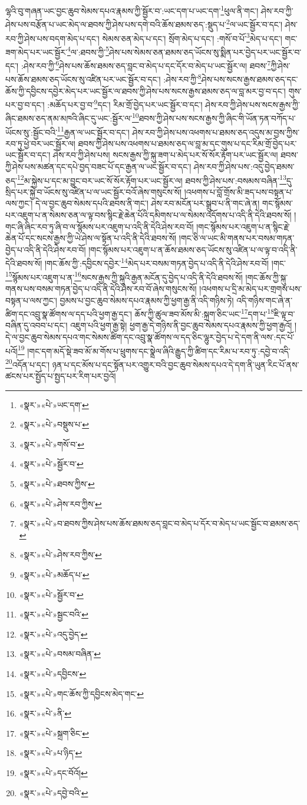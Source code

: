ལྷའི་བུ་གཞན་ཡང་བྱང་ཆུབ་སེམས་དཔའ་རྣམས་ཀྱི་སྦྱོར་བ་:ཡང་དག་པ་ཡང་དག་\footnote{«སྣར་»«པེ་»ཡང་དག་}ཕུལ་ནི་གང་། ཤེས་རབ་ཀྱི་ཤེས་པས་བརྩོན་པ་ཡང་མེད་ལ་ཐབས་ཀྱི་ཤེས་པས་དགེ་བའི་ཆོས་ཐམས་ཅད་:སྡུད་པ་\footnote{«སྣར་»«པེ་»བསྡུས་པ་}ལ་ཡང་སྦྱོར་བ་དང་། ཤེས་རབ་ཀྱི་ཤེས་པས་བདག་མེད་པ་དང་། སེམས་ཅན་མེད་པ་དང་། སྲོག་མེད་པ་དང་། :གསོ་བ་པོ་\footnote{«སྣར་»«པེ་»གསོ་བ་}མེད་པ་དང་། གང་ཟག་མེད་པར་ཡང་སྦྱོར་\footnote{«སྣར་»«པེ་»སྦྱོར་བ་}ལ་:ཐབས་ཀྱི་\footnote{«སྣར་»«པེ་»ཐབས་ཀྱིས་}ཤེས་པས་སེམས་ཅན་ཐམས་ཅད་ཡོངས་སུ་སྨིན་པར་བྱེད་པར་ཡང་སྦྱོར་བ་དང་། :ཤེས་རབ་ཀྱི་\footnote{«སྣར་»«པེ་»ཤེས་རབ་ཀྱིས་}ཤེས་པས་ཆོས་ཐམས་ཅད་བླང་བ་མེད་པ་དང་དོར་བ་མེད་པ་ཡང་སྦྱོར་ལ། ཐབས་\footnote{«སྣར་»«པེ་»བ་ཐབས་ཀྱིས་ཤེས་པས་ཆོས་ཐམས་ཅད་བླང་བ་མེད་པ་དོར་བ་མེད་པ་ཡང་སྦྱོང་བ་ཐམས་ཅད་}ཀྱི་ཤེས་པས་ཆོས་ཐམས་ཅད་ཡོངས་སུ་འཛིན་པར་ཡང་སྦྱོར་བ་དང་། :ཤེས་རབ་ཀྱི་\footnote{«སྣར་»«པེ་»ཤེས་རབ་ཀྱིས་}ཤེས་པས་སངས་རྒྱས་ཐམས་ཅད་དང་ཆོས་ཀྱི་དབྱིངས་དབྱེར་མེད་པར་ཡང་སྦྱོར་ལ་ཐབས་ཀྱི་ཤེས་པས་སངས་རྒྱས་ཐམས་ཅད་ལ་བླ་མར་བྱ་བ་དང་། གུས་པར་བྱ་བ་དང་། :མཆོད་པར་བྱ་བ་\footnote{«སྣར་»«པེ་»མཆོད་པ་}དང་། རིམ་གྲོ་བྱེད་པར་ཡང་སྦྱོར་བ་དང་། ཤེས་རབ་ཀྱི་ཤེས་པས་སངས་རྒྱས་ཀྱི་ཞིང་ཐམས་ཅད་ནམ་མཁའི་ཞིང་དུ་ཡང་:སྦྱོར་ལ་\footnote{«སྣར་»«པེ་»སྦྱོར་བ་}ཐབས་ཀྱི་ཤེས་པས་སངས་རྒྱས་ཀྱི་ཞིང་གི་ཡོན་ཏན་བཀོད་པ་ཡོངས་སུ་:སྦྱོང་བའི་\footnote{«སྣར་»«པེ་»སྦྱང་བའི་}རྒྱན་ལ་ཡང་སྦྱོར་བ་དང་། ཤེས་རབ་ཀྱི་ཤེས་པས་འཕགས་པ་ཐམས་ཅད་འདུས་མ་བྱས་ཀྱིས་རབ་ཏུ་ཕྱེ་བར་ཡང་སྦྱོར་ལ། ཐབས་ཀྱི་ཤེས་པས་འཕགས་པ་ཐམས་ཅད་ལ་བླ་མ་དང་གུས་པ་དང་རིམ་གྲོ་བྱེད་པར་ཡང་སྦྱོར་བ་དང་། ཤེས་རབ་ཀྱི་ཤེས་པས། སངས་རྒྱས་ཀྱི་སྐུ་ཟག་པ་མེད་པར་སོ་སོར་རྟོག་པར་ཡང་སྦྱོར་ལ། ཐབས་ཀྱི་ཤེས་པས་མཚན་དང་དཔེ་བྱད་བཟང་པོ་དང་རྒྱན་ལ་ཡང་སྦྱོར་བ་དང་། ཤེས་རབ་ཀྱི་ཤེས་པས་:འདུ་བྱེད་ཐམས་ཅད་\footnote{«སྣར་»«པེ་»འདུ་བྱེད་}མ་སྐྱེས་པ་དང་མ་བྱུང་བར་ཡང་སོ་སོར་རྟོག་པར་ཡང་སྦྱོར་ལ། ཐབས་ཀྱི་ཤེས་པས་:བསམས་བཞིན་\footnote{«སྣར་»«པེ་»བསམ་བཞིན་}དུ་སྲིད་པར་སྐྱེ་བ་ཡོངས་སུ་འཛིན་པ་ལ་ཡང་སྦྱོར་བའོ་ཞེས་གསུངས་སོ། །འཕགས་པ་བློ་གྲོས་མི་ཟད་པས་བསྟན་པ་ལས་ཀྱང་། དེ་ལ་བྱང་ཆུབ་སེམས་དཔའི་ཐབས་ནི་གང་། ཤེས་རབ་མངོན་པར་སྒྲུབ་པ་ནི་གང་ཞེ་ན། གང་སྙོམས་པར་འཇུག་པ་ན་སེམས་ཅན་ལ་ལྟ་བས་སྙིང་རྗེ་ཆེན་པོའི་དམིགས་པ་ལ་སེམས་འདོགས་པ་འདི་ནི་དེའི་ཐབས་སོ། །གང་ཞི་ཞིང་རབ་ཏུ་ཞི་བ་ལ་སྙོམས་པར་འཇུག་པ་འདི་ནི་དེའི་ཤེས་རབ་བོ། །གང་སྙོམས་པར་འཇུག་པ་ན་སྙིང་རྗེ་ཆེན་པོ་དང་སངས་རྒྱས་ཀྱི་ཡེ་ཤེས་ལ་སྟོན་པ་འདི་ནི་དེའི་ཐབས་སོ། །གང་ཅི་ལ་ཡང་མི་གནས་པར་བསམ་གཏན་བྱེད་པ་འདི་ནི་དེའི་ཤེས་རབ་བོ། །གང་སྙོམས་པར་འཇུག་པ་ན་ཆོས་ཐམས་ཅད་ཡོངས་སུ་འཛིན་པ་ལ་ལྟ་བ་འདི་ནི་དེའི་ཐབས་སོ། །གང་ཆོས་ཀྱི་:དབྱིངས་དབྱེར་\footnote{«སྣར་»«པེ་»དབྱིངས་}མེད་པར་བསམ་གཏན་བྱེད་པ་འདི་ནི་དེའི་ཤེས་རབ་བོ། །གང་\footnote{«སྣར་»«པེ་»གང་ཆོས་ཀྱི་དབྱིངས་མེད་གང་}སྙོམས་པར་འཇུག་པ་ན་\footnote{«སྣར་»«པེ་»ནི་}སངས་རྒྱས་ཀྱི་སྐུའི་རྒྱན་མངོན་དུ་བྱེད་པ་འདི་ནི་དེའི་ཐབས་སོ། །གང་ཆོས་ཀྱི་སྐུ་གནས་པས་བསམ་གཏན་བྱེད་པ་འདི་ནི་དེའི་ཤེས་རབ་བོ་ཞེས་གསུངས་སོ། །འཕགས་པ་དྲི་མ་མེད་པར་གྲགས་པས་བསྟན་པ་ལས་ཀྱང་། བྱམས་པ་བྱང་ཆུབ་སེམས་དཔའ་རྣམས་ཀྱི་ཕྱག་རྒྱ་ནི་འདི་གཉིས་ཏེ། འདི་གཉིས་གང་ཞེ་ན་ཚིག་དང་འབྲུ་སྣ་ཚོགས་ལ་དད་པའི་ཕྱག་རྒྱ་དང་། ཆོས་ཀྱི་ཚུལ་ཟབ་མོས་མི་:སྐྲག་ཅིང་ཡང་\footnote{«སྣར་»«པེ་»སྐྲག་ཅིང་}དག་པ་\footnote{«སྣར་»«པེ་»པ་ཉིད་}ཇི་ལྟ་བ་བཞིན་དུ་འབབ་པ་དང་། འཇུག་པའི་ཕྱག་རྒྱ་སྟེ། ཕྱག་རྒྱ་དེ་གཉིས་ནི་བྱང་ཆུབ་སེམས་དཔའ་རྣམས་ཀྱི་ཕྱག་རྒྱའོ། །དེ་ལ་བྱང་ཆུབ་སེམས་དཔའ་གང་སེམས་ཚིག་དང་འབྲུ་སྣ་ཚོགས་ལ་དད་ཅིང་ལྷུར་བྱེད་པ་དེ་དག་ནི་ལས་:དང་པོ་པའོ།\footnote{«སྣར་»«པེ་»དང་བོའོ།} །གང་དག་མདོ་སྡེ་ཟབ་མོ་མ་གོས་པ་ཕྲུགས་དང་སྣྲེལ་ཞིའི་རྒྱུད་ཀྱི་ཚིག་དང་རིམ་པ་རབ་ཏུ་:དབྱེ་བ་འདི་\footnote{«སྣར་»«པེ་»དབྱེ་བའི་}འདོན་པ་དང་། ཉན་པ་དང་མོས་པ་དང་སྟོན་པར་འགྱུར་བའི་བྱང་ཆུབ་སེམས་དཔའ་དེ་དག་ནི་ཡུན་རིང་པོ་ནས་ཚངས་པར་སྤྱོད་པ་སྤྱད་པར་རིག་པར་བྱའོ། 